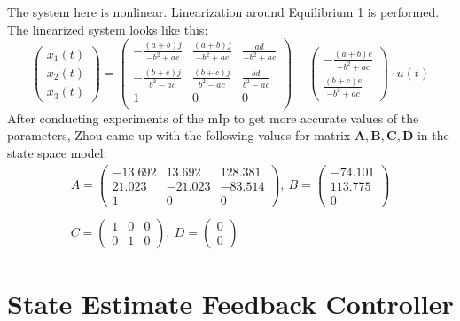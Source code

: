 \documentclass{article}
\begin{document}
The system here is nonlinear. Linearization around Equilibrium 1 is performed. The linearized system looks like this:
\begin{equation}
\dot{
\begin{pmatrix}
x_1(t)\\[6pt]
x_2(t)\\[6pt]
x_3(t)
\end{pmatrix}
}
=
\begin{pmatrix}
-\frac{(a+b)j}{-b^2+ac} & \frac{(a+b)j}{-b^2+ac} & \frac{ad}{-b^2+ac}\\[6pt]
-\frac{(b+c)j}{b^2-ac} & \frac{(b+c)j}{b^2-ac} & \frac{bd}{b^2-ac}\\[6pt]
1 & 0 & 0\\
\end{pmatrix}
+
\begin{pmatrix}
-\frac{(a+b)e}{-b^2+ac}\\[6pt]
\frac{(b+c)e}{-b^2+ac}
\end{pmatrix}
\cdot
u(t)
\end{equation}
After conducting experiments of the mIp to get more accurate values of the parameters, Zhou came up with the following values for matrix $\boldsymbol{A,B,C,D}$ in the state space model:
\begin{equation}
\begin{gathered}
A=
\begin{pmatrix}
-13.692 & 13.692 & 128.381\\
21.023 & -21.023 & -83.514\\
1 & 0 & 0
\end{pmatrix}
,\
B=
\begin{pmatrix}
-74.101\\
113.775\\
0
\end{pmatrix}
\\
\\
C=
\begin{pmatrix}
1 & 0 & 0 \\
0 & 1 & 0
\end{pmatrix}
,\
D=
\begin{pmatrix}
0\\
0
\end{pmatrix}
\end{gathered}
\end{equation}
\section{State Estimate Feedback Controller}
\end{document}
